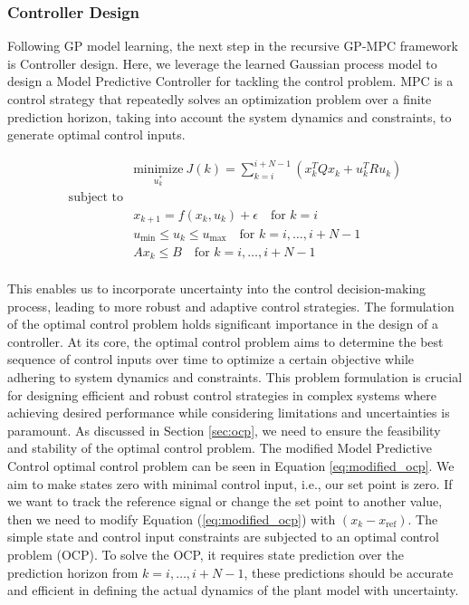 \subsubsection{Controller Design}\label{sec:controllerdesign}

Following GP model learning, the next step in the recursive GP-MPC framework is Controller design. Here, we leverage the learned Gaussian process model to design a Model Predictive Controller for tackling the control problem. MPC is a control strategy that repeatedly solves an optimization problem over a finite prediction horizon, taking into account the system dynamics and constraints, to generate optimal control inputs. 

\begin{equation} \label{eq:modified_ocp}
    \begin{aligned}
 & \underset{u^*_k}{\text{minimize}} \ J(k) = \sum_{k=i}^{i+N-1}( x_k^T Q x_k + u_k^T R u_k )  \\
 \text{subject to}\\
& x_{k+1} = f(x_k, u_k) + \epsilon \quad \text{for } k=i \\
& u_{\text{min}} \leq u_k \leq u_{\text{max}} \quad \text{for } k=i,\ldots,i+N-1 \\
& A x_k \leq B \quad \text{for } k=i,\ldots,i+N-1 \\
\end{aligned}
\end{equation}

This enables us to incorporate uncertainty into the control decision-making process, leading to more robust and adaptive control strategies. The formulation of the optimal control problem holds significant importance in the design of a controller. At its core, the optimal control problem aims to determine the best sequence of control inputs over time to optimize a certain objective while adhering to system dynamics and constraints. This problem formulation is crucial for designing efficient and robust control strategies in complex systems where achieving desired performance while considering limitations and uncertainties is paramount. As discussed in Section \ref{sec:ocp}, we need to ensure the feasibility and stability of the optimal control problem. The modified Model Predictive Control optimal control problem can be seen in Equation \eqref{eq:modified_ocp}. We aim to make states zero with minimal control input, i.e., our set point is zero. If we want to track the reference signal or change the set point to another value, then we need to modify Equation (\ref{eq:modified_ocp}) with $(x_k - x_{\text{ref}})$. The simple state and control input constraints are subjected to an optimal control problem (OCP). To solve the OCP, it requires state prediction over the prediction horizon from $k = i, \ldots, i + N - 1$, these predictions should be accurate and efficient in defining the actual dynamics of the plant model with uncertainty. 

